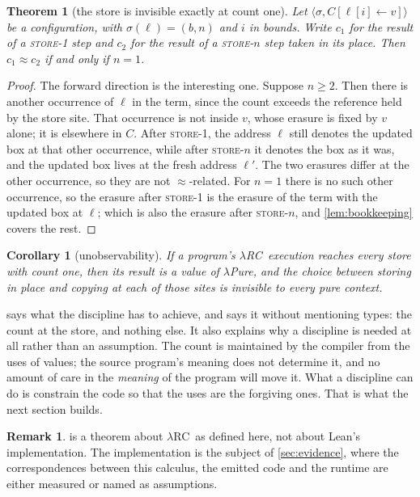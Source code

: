 \documentclass[11pt,a4paper]{article}
\theoremstyle{definition}
\newtheorem{remark}[definition]{Remark}
\theoremstyle{plain}
\newtheorem{theorem}[definition]{Theorem}
\newtheorem{corollary}[definition]{Corollary}
\newcommand{\lrc}{\textup{$\lambda$RC}}
\newcommand{\lpure}{\textup{$\lambda$Pure}}
\newcommand{\cm}{\mathrel{\approx}}
\begin{document}
\begin{theorem}[the store is invisible exactly at count one]\label{thm:store}
Let $\langle \sigma, C[\ell[i] \leftarrow v] \rangle$ be a configuration, with
$\sigma(\ell) = (b, n)$ and $i$ in bounds. Write $c_1$ for the result of a
\textup{\textsc{store-1}} step and $c_2$ for the result of a \textup{\textsc{store-\(n\)}} step
taken in its place. Then $c_1 \cm c_2$ if and only if $n = 1$.
\end{theorem}

\begin{proof}
The forward direction is the interesting one. Suppose $n \geq 2$. Then there is
another occurrence of $\ell$ in the term, since the count exceeds the reference
held by the store site. That occurrence is not inside $v$, whose erasure is
fixed by $v$ alone; it is elsewhere in $C$. After \textup{\textsc{store-1}}, the address
$\ell$ still denotes the updated box at that other occurrence, while after
\textup{\textsc{store-\(n\)}} it denotes the box as it was, and the updated box lives at
the fresh address $\ell'$. The two erasures differ at the other occurrence, so
they are not $\cm$-related. For $n = 1$ there is no such other occurrence, so
the erasure after \textup{\textsc{store-1}} is the erasure of the term with the updated
box at $\ell$; which is also the erasure after \textup{\textsc{store-\(n\)}}, and
\cref{lem:bookkeeping} covers the rest.
\end{proof}

\begin{corollary}[unobservability]\label{cor:unobs}
If a program's \lrc\ execution reaches every store with count one, then its
result is a value of \lpure, and the choice between storing in place and copying
at each of those sites is invisible to every pure context.
\end{corollary}

 says what the discipline has to achieve, and says it without
mentioning types: the count at the store, and nothing else. It also explains why
a discipline is needed at all rather than an assumption. The count is
maintained by the compiler from the uses of values; the source program's meaning
does not determine it, and no amount of care in the \emph{meaning} of the
program will move it. What a discipline can do is constrain the code so that the
uses are the forgiving ones. That is what the next section builds.

\begin{remark}
 is a theorem about \lrc\ as defined here, not about Lean's
implementation. The implementation is the subject of \cref{sec:evidence}, where
the correspondences between this calculus, the emitted code and the runtime are
either measured or named as assumptions.
\end{remark}
\end{document}
